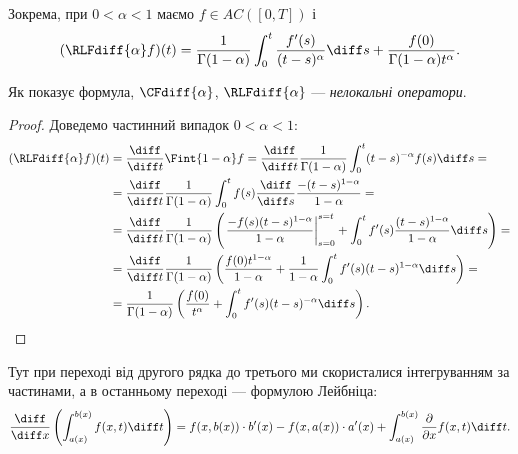 \begin{example}
    Зокрема, при $0 < \alpha < 1$ маємо $f \in AC([0, T])$ і
    \begin{equation}
        (\RLFdiff{\alpha} f) (t) = \frac{1}{\Gamma(1 - \alpha)} \int_0^t \frac{f'(s)}{(t - s)^\alpha} \diff s + \frac{f(0)}{\Gamma(1 - \alpha) t^\alpha}.
    \end{equation}
\end{example}

\begin{remark}
    Як показує формула, $\CFdiff{\alpha}$, $\RLFdiff{\alpha}$ --- \textit{нелокальні оператори}.
\end{remark}

\begin{proof}
    Доведемо частинний випадок $0 < \alpha < 1$:
    \begin{equation}
        \begin{aligned}
        (\RLFdiff{\alpha} f)(t) &= \frac{\diff}{\diff t} \Fint{1 - \alpha} f = \frac{\diff}{\diff t} \frac{1}{\Gamma(1 - \alpha)} \int_0^t (t - s)^{-\alpha} f(s) \diff s = \\
        &= \frac{\diff}{\diff t} \frac{1}{\Gamma(1 - \alpha)} \int_0^t f(s) \frac{\diff}{\diff s} \frac{ -(t-s)^{1-\alpha}}{1 - \alpha} = \\
        &= \frac{\diff}{\diff t} \frac{1}{\Gamma(1 - \alpha)} \left( \left. \frac{-f(s)(t-s)^{1-\alpha}}{1 - \alpha} \right|_{s = 0}^{s = t} + \int_0^t f'(s) \frac{(t - s)^{1- \alpha}}{1 - \alpha} \diff s \right) = \\
        &= \frac{\diff}{\diff t} \frac{1}{\Gamma(1 - \alpha)} \left( \frac{f(0) t^{1-\alpha}}{1 - \alpha} + \frac{1}{1 - \alpha} \int_0^t f'(s) (t - s)^{1 - \alpha} \diff s \right) = \\
        &= \frac{1}{\Gamma(1 - \alpha)} \left( \frac{f(0)}{t^\alpha} + \int_0^t f'(s) (t - s)^{- \alpha} \diff s \right).
        \end{aligned}
    \end{equation}
\end{proof}

\begin{remark}
    Тут при переході від другого рядка до третього ми скористалися інтегруванням за частинами, а в останньому переході --- формулою Лейбніца:
    \begin{equation}
        \frac{\diff}{\diff x} \left( \int_{a(x)}^{b(x)} f(x, t) \diff t \right) = f(x, b(x)) \cdot b'(x) - f(x, a(x)) \cdot a'(x) + \int_{a(x)}^{b(x)} \frac{\partial}{\partial x} f(x, t) \diff t.
    \end{equation}
\end{remark}

